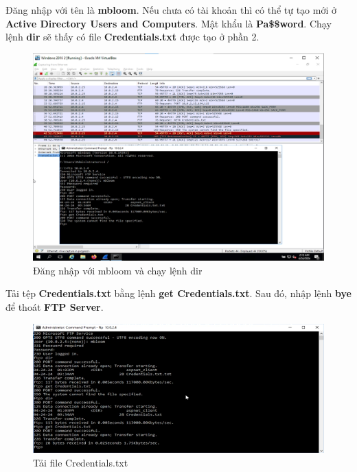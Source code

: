 \newpage

 Đăng nhập với tên là \textbf{mbloom}. Nếu chưa có tài khoản thì có thể tự tạo mới ở \textbf{Active Directory Users and Computers}. Mật khẩu là \textbf{Pa\$\$word}. Chạy lệnh \textbf{dir} sẽ thấy có file \textbf{Credentials.txt} được tạo ở phần 2.

\begin{figure}[!htb]
    \centering
    \includegraphics[width=1\linewidth]{figure//chapter9//lab9_3/login_ftp_server.png}
    \caption{Đăng nhập với mbloom và chạy lệnh dir}
    \label{fig:enter-label}
\end{figure}

 Tải tệp \textbf{Credentials.txt} bằng lệnh \textbf{get Credentials.txt}. Sau đó, nhập lệnh \textbf{bye} để thoát \textbf{FTP Server}.

\begin{figure}[!htb]
    \centering
    \includegraphics[width=1\linewidth]{figure//chapter9//lab9_3/get_file.png}
    \caption{Tải file Credentials.txt}
    \label{fig:enter-label}
\end{figure}

